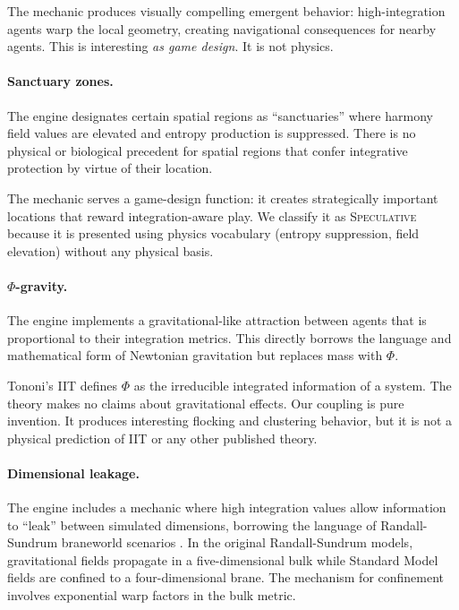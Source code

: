 \documentclass[12pt,a4paper]{article}
\begin{document}
The mechanic produces visually compelling emergent behavior:
high-integration agents warp the local geometry, creating
navigational consequences for nearby agents.  This is
interesting \emph{as game design}.  It is not physics.

\paragraph{Sanctuary zones.}
The engine designates certain spatial regions as ``sanctuaries''
where harmony field values are elevated and entropy production
is suppressed.  There is no physical or biological precedent for
spatial regions that confer integrative protection by virtue of
their location.

The mechanic serves a game-design function: it creates
strategically important locations that reward integration-aware
play.  We classify it as \textsc{Speculative} because it is
presented using physics vocabulary (entropy suppression, field
elevation) without any physical basis.

\paragraph{$\Phi$-gravity.}
The engine implements a gravitational-like attraction between
agents that is proportional to their integration metrics.  This
directly borrows the language and mathematical form of
Newtonian gravitation but replaces mass with $\Phi$.

Tononi's IIT \citep{tononi2004,tononi2016} defines $\Phi$ as
the irreducible integrated information of a system.  The theory
makes no claims about gravitational effects.  Our coupling is
pure invention.  It produces interesting flocking and clustering
behavior, but it is not a physical prediction of IIT or any
other published theory.

\paragraph{Dimensional leakage.}
The engine includes a mechanic where high integration values
allow information to ``leak'' between simulated dimensions,
borrowing the language of Randall-Sundrum braneworld scenarios
\citep{randall1999}.  In the original Randall-Sundrum models,
gravitational fields propagate in a five-dimensional bulk while
Standard Model fields are confined to a four-dimensional brane.
The mechanism for confinement involves exponential warp factors
in the bulk metric.
\end{document}
